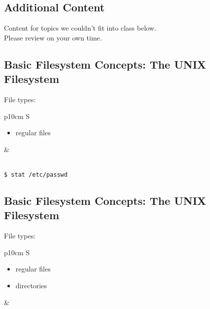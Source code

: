 \documentclass[xga]{xdvislides}
\begin{document}

\subsection{Additional Content}

Content for topics we couldn't fit into class below.
\\
Please review on your own time.


\subsection{Basic Filesystem Concepts: The UNIX Filesystem}
File types:
\\

\begin{tabular}{ p{10cm} S }
\begin{itemize}
	\item regular files
\end{itemize}
&  \\
\end{tabular}
\\

\verb+$ stat /etc/passwd+


\subsection{Basic Filesystem Concepts: The UNIX Filesystem}
File types:
\\

\begin{tabular}{ p{10cm} S }
\begin{itemize}
	\item regular files
	\item directories
\end{itemize}
&  \\
\end{tabular}
\\
\end{document}
